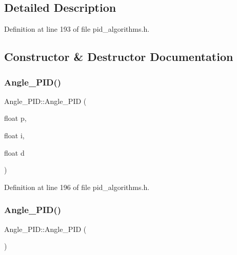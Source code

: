 \subsection{Detailed Description}


Definition at line 193 of file pid\+\_\+algorithms.\+h.



\subsection{Constructor \& Destructor Documentation}
\mbox{\label{class_angle___p_i_d_a5634b51e00e8d4c80332dcae7968f064}} 
\subsubsection{\texorpdfstring{Angle\_PID()}{Angle\_PID()}\hspace{0.1cm}{\footnotesize\ttfamily [1/4]}}
{\footnotesize\ttfamily Angle\+\_\+\+P\+I\+D\+::\+Angle\+\_\+\+P\+ID (\begin{DoxyParamCaption}\item[{float}]{p,  }\item[{float}]{i,  }\item[{float}]{d }\end{DoxyParamCaption})\hspace{0.3cm}{\ttfamily [inline]}}



Definition at line 196 of file pid\+\_\+algorithms.\+h.

\mbox{\label{class_angle___p_i_d_a9d60514c940a5f5fefb3414c54277b1b}} 
\subsubsection{\texorpdfstring{Angle\_PID()}{Angle\_PID()}\hspace{0.1cm}{\footnotesize\ttfamily [2/4]}}
{\footnotesize\ttfamily Angle\+\_\+\+P\+I\+D\+::\+Angle\+\_\+\+P\+ID (\begin{DoxyParamCaption}{ }\end{DoxyParamCaption})\hspace{0.3cm}{\ttfamily [inline]}}



